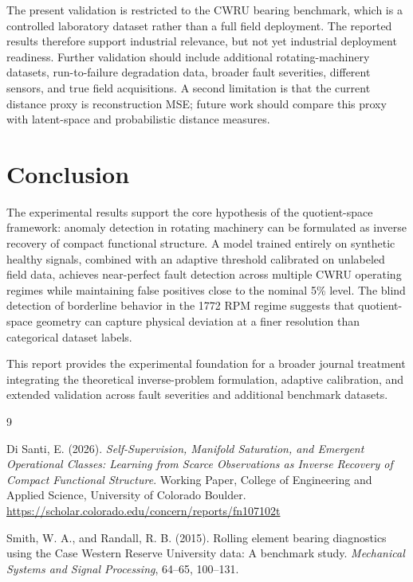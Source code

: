 \documentclass[11pt]{article}
\begin{document}
The present validation is restricted to the CWRU bearing benchmark, which is a controlled laboratory dataset rather than a full field deployment. The reported results therefore support industrial relevance, but not yet industrial deployment readiness. Further validation should include additional rotating-machinery datasets, run-to-failure degradation data, broader fault severities, different sensors, and true field acquisitions. A second limitation is that the current distance proxy is reconstruction MSE; future work should compare this proxy with latent-space and probabilistic distance measures.

\section{Conclusion}

The experimental results support the core hypothesis of the quotient-space framework: anomaly detection in rotating machinery can be formulated as inverse recovery of compact functional structure. A model trained entirely on synthetic healthy signals, combined with an adaptive threshold calibrated on unlabeled field data, achieves near-perfect fault detection across multiple CWRU operating regimes while maintaining false positives close to the nominal 5\% level. The blind detection of borderline behavior in the 1772 RPM regime suggests that quotient-space geometry can capture physical deviation at a finer resolution than categorical dataset labels.

This report provides the experimental foundation for a broader journal treatment integrating the theoretical inverse-problem formulation, adaptive calibration, and extended validation across fault severities and additional benchmark datasets.


\begin{thebibliography}{9}

Di Santi, E. (2026).
\textit{Self-Supervision, Manifold Saturation, and Emergent Operational Classes: Learning from Scarce Observations as Inverse Recovery of Compact Functional Structure}.
Working Paper, College of Engineering and Applied Science, University of Colorado Boulder.
\url{https://scholar.colorado.edu/concern/reports/fn107102t}

Smith, W. A., and Randall, R. B. (2015).
Rolling element bearing diagnostics using the Case Western Reserve University data: A benchmark study.
\textit{Mechanical Systems and Signal Processing}, 64--65, 100--131.

\end{thebibliography}
\end{document}
